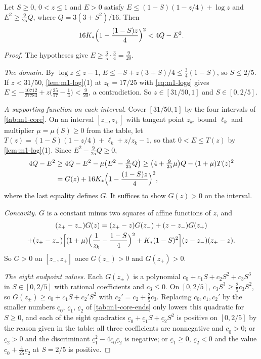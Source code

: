 \begin{lemma}\label{lem:m1-core}
  Let $S\ge0$, $0<z\le1$ and $E>0$ satisfy
  $E\le(1-S)(1-z/4)+\log z$ and $E^2\ge\frac9{25}Q$, where $Q=3(3+S^2)/16$. Then
  \[
    16K_*\Bigl(1-\frac{(1-S)z}4\Bigr)^2<4Q-E^2 .
  \]
\end{lemma}

\begin{proof}
  The hypotheses give $E\ge\frac35\cdot\frac34=\frac9{20}$.

  \emph{The domain.} By $\log z\le z-1$, $E\le-S+z(3+S)/4\le\frac34(1-S)$, so $S\le2/5$. If
  $z<31/50$, \cref{lem:m1-log}(1) at $z_0=17/25$ with \eqref{eq:m1-logs} gives
  $E\le-\frac{10712}{27783}+z\bigl(\frac{25}{17}-\frac14\bigr)<\frac9{20}$, a contradiction. So
  $z\in[31/50,1]$ and $S\in[0,2/5]$.

  \emph{A supporting function on each interval.} Cover $[31/50,1]$ by the four intervals of
  \cref{tab:m1-core}. On an interval $[z_-,z_+]$ with tangent point $z_k$, bound $\ell_k$ and
  multiplier $\mu=\mu(S)\ge0$ from the table, let
  $T(z)=(1-S)(1-z/4)+\ell_k+z/z_k-1$, so that $0<E\le T(z)$ by \cref{lem:m1-log}(1). Since
  $E^2-\frac9{25}Q\ge0$,
  \begin{align*}
    4Q-E^2&\ge 4Q-E^2-\mu\bigl(E^2-\tfrac9{25}Q\bigr)
    \ge\bigl(4+\tfrac9{25}\mu\bigr)Q-(1+\mu)T(z)^2\\
    &=G(z)+16K_*\Bigl(1-\frac{(1-S)z}4\Bigr)^2,
  \end{align*}
  where the last equality defines $G$. It suffices to show $G(z)>0$ on the interval.

  \emph{Concavity.} $G$ is a constant minus two squares of affine functions of $z$, and
  \begin{multline*}
    (z_+-z_-)G(z)=(z_+-z)G(z_-)+(z-z_-)G(z_+)\\
    +(z_+-z_-)\Bigl[(1+\mu)\Bigl(\frac1{z_k}-\frac{1-S}4\Bigr)^2+K_*(1-S)^2\Bigr](z-z_-)(z_+-z).
  \end{multline*}
  So $G>0$ on $[z_-,z_+]$ once $G(z_-)>0$ and $G(z_+)>0$.

  \emph{The eight endpoint values.} Each $G(z_\pm)$ is a polynomial
  $c_0+c_1S+c_2S^2+c_3S^3$ in $S\in[0,2/5]$ with rational coefficients and $c_3\le0$. On
  $[0,2/5]$, $c_3S^3\ge\frac25c_3S^2$, so $G(z_\pm)\ge c_0+c_1S+c_2'S^2$ with
  $c_2'=c_2+\frac25c_3$. Replacing $c_0,c_1,c_2'$ by the smaller numbers $\underline c_0$,
  $\underline c_1$, $\underline c_2$ of \cref{tab:m1-core-ends} only lowers this quadratic for
  $S\ge0$, and each of the eight quadratics $\underline c_0+\underline c_1S+\underline c_2S^2$ is
  positive on $[0,2/5]$ by the reason given in the table: all three coefficients are nonnegative
  and $\underline c_0>0$; or $\underline c_2>0$ and the discriminant
  $\underline c_1^2-4\underline c_0\underline c_2$ is negative; or $\underline c_1\ge0$,
  $\underline c_2<0$ and the value $\underline c_0+\frac4{25}\underline c_2$ at $S=2/5$ is
  positive.
\end{proof}


